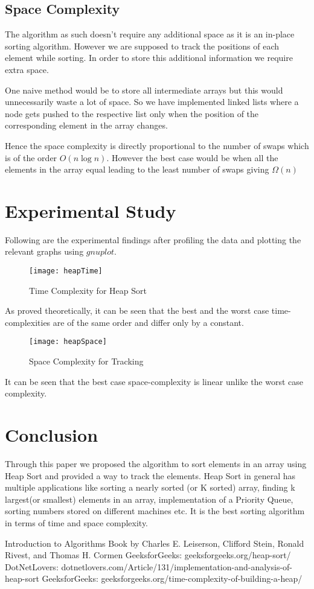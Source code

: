 \documentclass[letterpaper, 11 pt, conference]{ieeeconf}  %
\begin{document}
\subsection{Space Complexity}
The algorithm as such doesn't require any additional space as it is an in-place sorting algorithm. However we are supposed to track the positions of each element while sorting. In order to store this additional information we require extra space. 

One naive method would be to store all intermediate arrays but this would unnecessarily waste a lot of space. So we have implemented linked lists where a node gets pushed to the respective list only when the position of the corresponding element in the array changes. 

Hence the space complexity is directly proportional to the number of swaps which is of the order $O(n \log n)$.
However the best case would be when all the elements in the array equal leading to the least number of swaps giving $\Omega (n)$

\section{Experimental Study}
Following are the experimental findings after profiling the data and plotting the relevant graphs using $gnuplot$.
\begin{figure}[H]
\texttt{[image: heapTime]}
\caption{Time Complexity for Heap Sort}
\end{figure}

As proved theoretically, it can be seen that the best and the worst case time-complexities are of the same order and differ only by a constant.

\begin{figure}[H]
\texttt{[image: heapSpace]}
\caption{Space Complexity for Tracking}
\end{figure}

It can be seen that the best case space-complexity is linear unlike the worst case complexity.

\section{Conclusion}
Through this paper we proposed the algorithm to sort elements in an array using Heap Sort and provided a way to track the elements. Heap Sort in general has multiple applications like sorting a nearly sorted (or K sorted) array, finding k largest(or smallest) elements in an array, implementation of a Priority Queue, sorting numbers stored on different machines etc. It is the best sorting algorithm in terms of time and space complexity.


\begin{thebibliography}{99}

 Introduction to Algorithms
Book by Charles E. Leiserson, Clifford Stein, Ronald Rivest, and Thomas H. Cormen
 GeeksforGeeks: geeksforgeeks.org/heap-sort/
 DotNetLovers: dotnetlovers.com/Article/131/implementation-and-analysis-of-heap-sort
 GeeksforGeeks: geeksforgeeks.org/time-complexity-of-building-a-heap/
\end{thebibliography}
\end{document}
